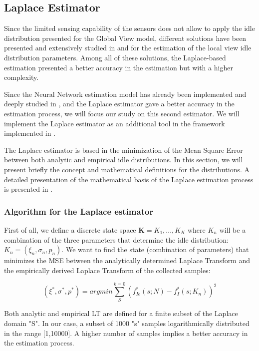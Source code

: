\subsection{Laplace Estimator} \label{sec:laplace_estimator}
Since the limited sensing capability of the sensors does not allow to apply the idle distribution presented for the Global View model, different solutions have been presented and extensively studied in \cite{marcello} and \cite{marcello-thesis} for the estimation of the local view idle distribution parameters. Among all of these solutions, the Laplace-based estimation presented a better accuracy in the estimation but with a higher complexity.

Since the Neural Network estimation model has already been implemented and deeply studied in \cite{marcello-thesis}, and the Laplace estimator gave a better accuracy in the estimation process, we will focus our study on this second estimator. We will implement the Laplace estimator as an additional tool in the framework implemented in \cite{marcello-thesis}.

The Laplace estimator is based in the minimization of the Mean Square Error between both analytic and empirical idle distributions. In this section, we will present briefly the concept and mathematical definitions for the distributions. A detailed presentation of the mathematical basis of the Laplace estimation process is presented in \cite{ioannis_laplace}.

\subsubsection{Algorithm for the Laplace estimator} \label{sec:algorithm_laplace}
First of all, we define a discrete state space $\textbf{K} = {K_1, ..., K_K}$ where $K_n$ will be a combination of the three parameters that determine the idle distribution: $K_n = (\xi_n, \sigma_n, p_n)$. We want to find the state (combination of parameters) that minimizes the \acs{MSE} between the analytically determined Laplace Transform and the empirically derived Laplace Transform of the collected samples:

\begin{equation}
(\xi^{*}, \sigma^{*}, p^{*}) = arg min \sum_{S}^{k=0}(f_{Ie}^{*}(s;N)-f_I^{*}(s;K_n))^2
\label{eq:min_MSE}
\end{equation}

Both analytic and empirical \acs{LT} are defined for a finite subset of the Laplace domain "S". In our case, a subset of 1000 "s" samples logarithmically distributed in the range [1,10000]. A higher number of samples implies a better accuracy in the estimation process. 

